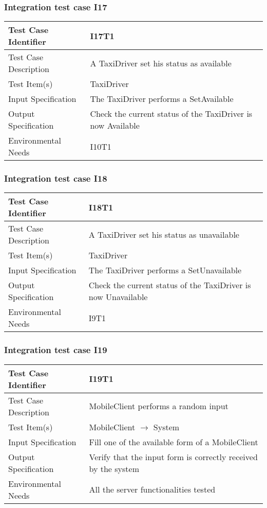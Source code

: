 		\subsubsection{Integration test case I17}
		\begin{center}
			\begin{tabular}{ |l p{10cm}| } \hline
				Test Case Identifier & I17T1 \\ \hline
				Test Case Description & A TaxiDriver set his status as available  \\ \hline
				Test Item(s) & TaxiDriver \\ \hline
				Input Specification & The TaxiDriver performs a SetAvailable \\ \hline
				Output Specification & Check the current status of the TaxiDriver is now Available \\ \hline
				Environmental Needs & I10T1 \\ \hline
			\end{tabular}
		\end{center}
		\subsubsection{Integration test case I18}
		\begin{center}
			\begin{tabular}{ |l p{10cm}| } \hline
				Test Case Identifier & I18T1 \\ \hline
				Test Case Description & A TaxiDriver set his status as unavailable  \\ \hline
				Test Item(s) & TaxiDriver \\ \hline
				Input Specification & The TaxiDriver performs a SetUnavailable \\ \hline
				Output Specification & Check the current status of the TaxiDriver is now Unavailable \\ \hline
				Environmental Needs & I9T1 \\ \hline
			\end{tabular}
		\end{center}
		\subsubsection{Integration test case I19}
		\begin{center}
			\begin{tabular}{ |l p{10cm}| } \hline
				Test Case Identifier & I19T1 \\ \hline
				Test Case Description & MobileClient performs a random input \\ \hline
				Test Item(s) & MobileClient $\rightarrow$ System \\ \hline
				Input Specification & Fill one of the available form of a MobileClient \\ \hline
				Output Specification & Verify that the input form is correctly received by the system \\ \hline
				Environmental Needs & All the server functionalities tested \\ \hline
			\end{tabular}
		\end{center}
